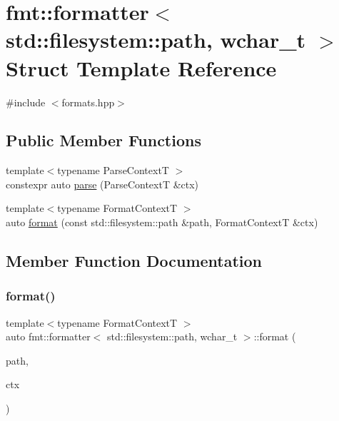 \hypertarget{structfmt_1_1formatter_3_01std_1_1filesystem_1_1path_00_01wchar__t_01_4}{}\section{fmt\+:\+:formatter$<$ std\+:\+:filesystem\+:\+:path, wchar\+\_\+t $>$ Struct Template Reference}
\label{structfmt_1_1formatter_3_01std_1_1filesystem_1_1path_00_01wchar__t_01_4}


{\ttfamily \#include $<$formats.\+hpp$>$}

\subsection*{Public Member Functions}
\begin{DoxyCompactItemize}
\item 
{\footnotesize template$<$typename Parse\+ContextT $>$ }\\constexpr auto \mbox{\hyperlink{structfmt_1_1formatter_3_01std_1_1filesystem_1_1path_00_01wchar__t_01_4_a23c734c19de2aae94816c00cfd7fcf01}{parse}} (Parse\+ContextT \&ctx)
\item 
{\footnotesize template$<$typename Format\+ContextT $>$ }\\auto \mbox{\hyperlink{structfmt_1_1formatter_3_01std_1_1filesystem_1_1path_00_01wchar__t_01_4_a0f5942ed46b1e21798433640ddc3d9b0}{format}} (const std\+::filesystem\+::path \&path, Format\+ContextT \&ctx)
\end{DoxyCompactItemize}


\subsection{Member Function Documentation}
\mbox{\label{structfmt_1_1formatter_3_01std_1_1filesystem_1_1path_00_01wchar__t_01_4_a0f5942ed46b1e21798433640ddc3d9b0}} 
\subsubsection{\texorpdfstring{format()}{format()}}
{\footnotesize\ttfamily template$<$typename Format\+ContextT $>$ \\
auto fmt\+::formatter$<$ std\+::filesystem\+::path, wchar\+\_\+t $>$\+::format (\begin{DoxyParamCaption}\item[{const std\+::filesystem\+::path \&}]{path,  }\item[{Format\+ContextT \&}]{ctx }\end{DoxyParamCaption})}

